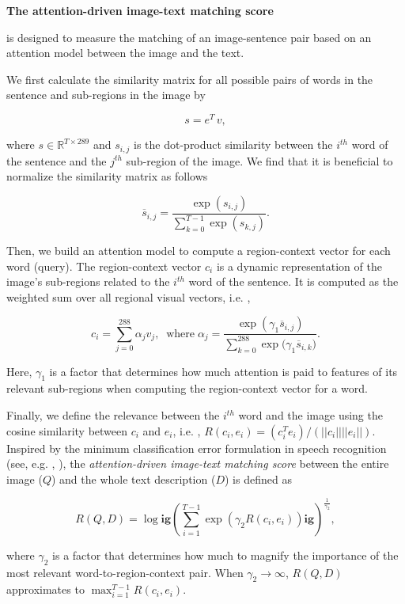 \textbf{The attention-driven image-text matching score }{ is designed to measure the matching of an image-sentence pair based on an attention model between the image and the text. 

We first calculate the similarity matrix for all possible pairs of words in the sentence and sub-regions in the image by

\begin{equation}\label{eq:similarity}
s = e^T\,v,
\end{equation}

where $s \in \mathbb{R}^{T\times 289}$ and $s_{i,j}$ is the dot-product similarity between the $i^{th}$ word of the sentence and the $j^{th}$ sub-region of the image. We find that it is beneficial to normalize the similarity matrix as follows

\begin{equation}\label{eq:similarity_normalized}
  \overline{s}_{i,j} = \frac{\exp(s_{i,j})}{\sum_{k=0}^{T-1}{\exp(s_{k,j})}}. 
\end{equation}

Then, we build an attention model to compute a region-context vector for each word (query). The region-context vector $c_{i}$ is a dynamic representation of the image's sub-regions related to the $i^{th}$ word of the sentence. It is computed as the weighted sum over all regional visual vectors, i.e. ,

\begin{equation}\label{eq:attention}
  c_i = \sum_{j=0}^{288}\alpha_{j}v_{j}, \; \; \text{where} \; \alpha_{j} = \frac{\exp(\gamma_{1} \overline{s}_{i,j})}{\sum_{k=0}^{288}{\exp(\gamma_{1} \overline{s}_{i,k}})}.
\end{equation}

Here, $\gamma_{1}$ is a factor that determines how much attention is paid to features of its relevant sub-regions when computing the region-context vector for a word. 

Finally, we define the relevance between the $i^{th}$ word and the image using the cosine similarity between $c_i$ and $e_i$, i.e. , $R(c_i, e_i) = (c_i^T e_i) / (||c_i|| ||e_i||)$. Inspired by the minimum classification error formulation in speech recognition (see, e.g. , \cite{Juang97minimum, he08discriminatice}), the \textit{attention-driven image-text matching score} between the entire image ($Q$) and the whole text description ($D$) is defined as

\begin{equation}\label{eq:relevance}
  R(Q, D) = \log \mathbf{ig}(\sum_{i=1}^{T-1} \exp(\gamma_{2} R(c_i, e_i)) \mathbf{ig})^{\frac{1}{\gamma_{2}}}, 
 \end{equation}

where $\gamma_{2}$ is a factor that determines how much to magnify the importance of the most relevant word-to-region-context pair. When $\gamma_{2}\to\infty$, $R(Q, D)$ approximates to $\max_{i=1}^{T-1} R(c_i, e_i)$. }

